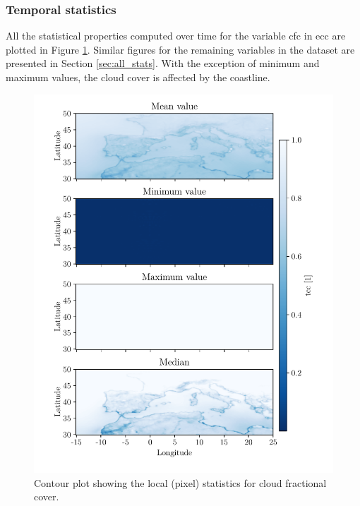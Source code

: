 \subsubsection{Temporal statistics}
All the statistical properties computed over time for the variable \acrshort{cfc} in \acrshort{ecc} are plotted in 
Figure \ref{fig:all_stats_tcc}. Similar figures for the remaining variables in the dataset are presented in Section \ref{sec:all_stats}. %
With the exception of minimum and maximum values, the cloud cover is affected by the coastline. 
\begin{figure}[ht]
    \centering
    \includegraphics{python_figs/all_stat_variable_tcc.pdf}
    \caption{Contour plot showing the local (pixel) statistics for cloud fractional cover.}
    \label{fig:all_stats_tcc}
\end{figure}

